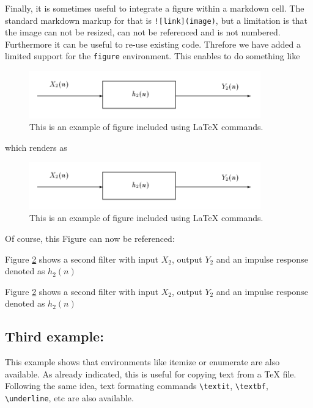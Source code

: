     Finally, it is sometimes useful to integrate a figure within a markdown
cell. The standard markdown markup for that is
\texttt{!{[}link{]}(image)}, but a limitation is that the image can not
be resized, can not be referenced and is not numbered. Furthermore it
can be useful to re-use existing code. Threfore we have added a limited
support for the \texttt{figure} environment. This enables to do
something like

\begin{listing}
\begin{figure}[H]
\centerline{\includegraphics[width=10cm]{example.png}}
\caption{\label{fig:example} This is an example of figure included using LaTeX commands.}
\end{figure}
\end{listing}

which renders as

\begin{figure}[H]
\centerline{\includegraphics[width=10cm]{example.png}}
\caption{\label{fig:example} This is an example of figure included using LaTeX commands.}
\end{figure}

Of course, this Figure can now be referenced:

\begin{listing}
Figure \ref{fig:example} shows a second filter with input $X_2$, output $Y_2$  and an impulse response denoted as $h_2(n)$
\end{listing}

Figure \ref{fig:example} shows a second filter with input $X_2$, output
$Y_2$ and an impulse response denoted as $h_2(n)$

    \subsection{Third example:}\label{third-example}

    This example shows that environments like itemize or enumerate are also
available. As already indicated, this is useful for copying text from a
TeX file. Following the same idea, text formating commands
\texttt{\textbackslash{}textit}, \texttt{\textbackslash{}textbf},
\texttt{\textbackslash{}underline}, etc are also available.

